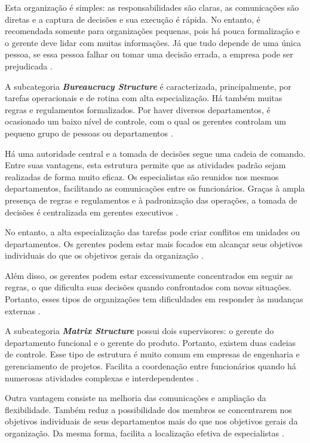 Esta organização é simples: as responsabilidades são claras, as comunicações são diretas e a captura de decisões e sua execução é rápida. No entanto, é recomendada somente para organizações pequenas, pois há pouca formalização e o gerente deve lidar com muitas informações. Já que tudo depende de uma única pessoa, se essa pessoa falhar ou tomar uma decisão errada, a empresa pode ser prejudicada \cite{Argente200655}.

A subcategoria \textit{\textbf{Bureaucracy Structure}} é caracterizada, principalmente, por tarefas operacionais e de rotina com alta especialização. Há também muitas regras e regulamentos formalizados. Por haver diversos departamentos, é ocasionado um baixo nível de controle, com o qual os gerentes controlam um pequeno grupo de pessoas ou departamentos \cite{Argente200655}. %

Há uma autoridade central e a tomada de decisões segue uma cadeia de comando. Entre suas vantagens, esta estrutura permite que as atividades padrão sejam realizadas de forma muito eficaz. Os especialistas são reunidos nos mesmos departamentos, facilitando as comunicações entre os funcionários. Graças à ampla presença de regras e regulamentos e à padronização das operações, a tomada de decisões é centralizada em gerentes executivos \cite{Argente200655}.

No entanto, a alta especialização das tarefas pode criar conflitos em unidades ou departamentos. Os gerentes podem estar mais focados em alcançar seus objetivos individuais do que os objetivos gerais da organização \cite{Argente200655}.

Além disso, os gerentes podem estar excessivamente concentrados em seguir as regras, o que dificulta suas decisões quando confrontados com novas situações. Portanto, esses tipos de organizações tem dificuldades em responder às mudanças externas \cite{Argente200655}.

A subcategoria \textbf{\textit{Matrix Structure}} possui dois supervisores: o gerente do departamento funcional e o gerente do produto. Portanto, existem duas cadeias de controle. Esse tipo de estrutura é muito comum em empresas de engenharia e gerenciamento de projetos.
Facilita a coordenação entre funcionários quando há numerosas atividades complexas e interdependentes \cite{Argente200655}.

Outra vantagem consiste na melhoria das comunicações e ampliação da flexibilidade. Também reduz a possibilidade dos membros se concentrarem nos objetivos individuais de seus departamentos mais do que nos objetivos gerais da organização. Da mesma forma, facilita a localização efetiva de especialistas \cite{Argente200655}.

